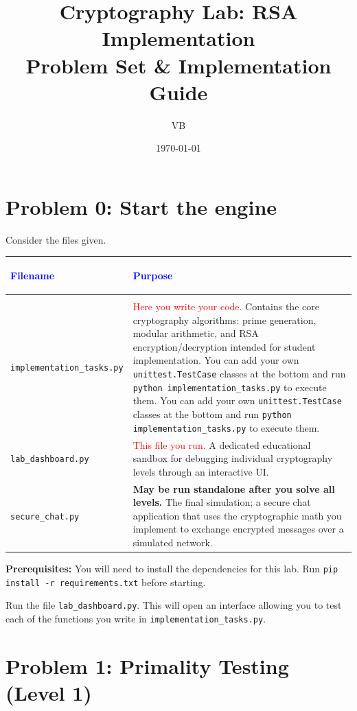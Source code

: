 \documentclass[11pt]{article}
\title{Cryptography Lab: RSA Implementation \\ \large Problem Set \& Implementation Guide}
\author{VB}
\date{\today}
\begin{document}
\maketitle

\section*{Problem 0: Start the engine}

Consider the files given.
\begin{center}
\renewcommand{\arraystretch}{1.5}
\begin{tabularx}{\textwidth}{@{} >{\bfseries\raggedright\arraybackslash}p{5.5cm} X @{}}
\toprule
\textcolor{blue}{Filename} & \textcolor{blue}{Purpose} \\ \midrule
\multicolumn{2}{@{}l}{\textbf{Direct Interaction}} \\ \midrule
\lstinline|implementation_tasks.py| & \textcolor{red}{Here you write your code.} Contains the core cryptography algorithms: prime generation, modular arithmetic, and RSA encryption/decryption intended for student implementation. You can add your own \lstinline|unittest.TestCase| classes at the bottom and run \lstinline|python implementation_tasks.py| to execute them. You can add your own \lstinline|unittest.TestCase| classes at the bottom and run \lstinline|python implementation_tasks.py| to execute them. \\
\lstinline|lab_dashboard.py| & \textcolor{red}{This file you run.} A dedicated educational sandbox for debugging individual cryptography levels through an interactive UI. \\
\lstinline|secure_chat.py| & \textbf{May be run standalone after you solve all levels.} The final simulation; a secure chat application that uses the cryptographic math you implement to exchange encrypted messages over a simulated network. \\
\bottomrule
\end{tabularx}
\end{center}

\textbf{Prerequisites:} You will need to install the dependencies for this lab. Run \lstinline|pip install -r requirements.txt| before starting.

Run the file \lstinline|lab_dashboard.py|. This will open an interface allowing you to test each of the functions you write in \lstinline|implementation_tasks.py|. 


\section*{Problem 1: Primality Testing (Level 1)}
\end{document}
